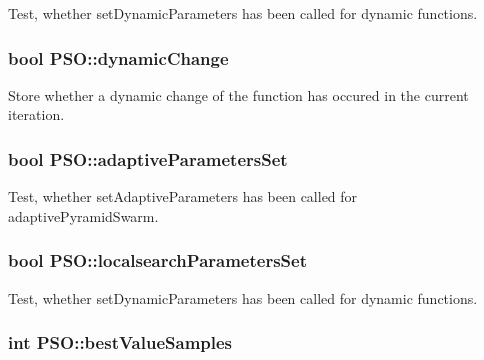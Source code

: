 Test, whether setDynamicParameters has been called for dynamic functions. 

\hypertarget{classPSO_70e82f9d6ccba90f8fefe9d66501af76}{
\subsubsection{\setlength{\rightskip}{0pt plus 5cm}bool {\bf PSO::dynamicChange}}}
\label{classPSO_70e82f9d6ccba90f8fefe9d66501af76}


Store whether a dynamic change of the function has occured in the current iteration. 

\hypertarget{classPSO_cf59fa26a01091b3496f28756b56d88b}{
\subsubsection{\setlength{\rightskip}{0pt plus 5cm}bool {\bf PSO::adaptiveParametersSet}}}
\label{classPSO_cf59fa26a01091b3496f28756b56d88b}


Test, whether setAdaptiveParameters has been called for adaptivePyramidSwarm. 

\hypertarget{classPSO_310f73da397718bc460c64fd62c3afef}{
\subsubsection{\setlength{\rightskip}{0pt plus 5cm}bool {\bf PSO::localsearchParametersSet}}}
\label{classPSO_310f73da397718bc460c64fd62c3afef}


Test, whether setDynamicParameters has been called for dynamic functions. 

\hypertarget{classPSO_01865aec8c14163d28f3e759ed70e316}{
\subsubsection{\setlength{\rightskip}{0pt plus 5cm}int {\bf PSO::bestValueSamples}}}
\label{classPSO_01865aec8c14163d28f3e759ed70e316}


